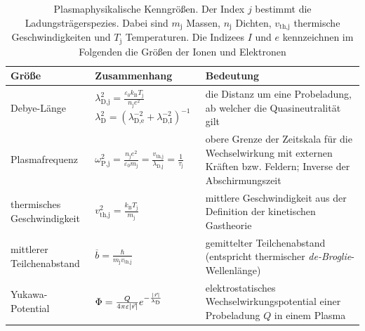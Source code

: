 \documentclass[numbers=noenddot,a4paper,notitlepage,twoside,BCOR15mm]{scrbook}
\newcommand{\ix}[1]{_\text{#1}}
\newcommand{\tilt}[1]{\textit{#1}}
\newcommand{\euler}{\mathnormal{e}}
\begin{document}
				\begin{table}[H]
					\centering
						\begin{tabular}{m{0.3\textwidth}|m{}|m{}}
							Größe & Zusammenhang & Bedeutung \\ 
							\hline  Debye-Länge & $\lambda\ix{D,j}^2=\frac{\varepsilon\ix{0}k\ix{B}T\ix{j}}{n\ix{j}e^2}$
							\newline
							$\lambda\ix{D}^2=\left(\lambda\ix{D,e}^{-2}+\lambda\ix{D,I}^{-2}\right)^{-1}$ & die Distanz um eine Probeladung, ab welcher die Quasineutralität gilt\\ 

							\hline Plasmafrequenz & $\omega\ix{P,j}^2=\frac{n\ix{j}e^2}{\varepsilon\ix{0}m\ix{j}}=\frac{v\ix{th,j}}{\lambda\ix{D,j}}=\frac{1}{\tau\ix{j}}$ & obere Grenze der Zeitskala für die Wechselwirkung mit externen Kräften bzw. Feldern; Inverse der Abschirmungszeit \\ 

							\hline thermisches Geschwindigkeit & $v\ix{th,j}^2=\frac{k\ix{B}T\ix{j}}{m\ix{j}}$ & mittlere Geschwindigkeit aus der Definition der kinetischen Gastheorie \\ 

							\hline mittlerer Teilchenabstand & $\overline{b}=\frac{\hbar}{m\ix{j}v\ix{th,j}}$ & gemittelter Teilchenabstand (entspricht thermischer \mbox{\tilt{de-Broglie}-Wellenlänge}) \\ 

							\hline Yukawa-Potential & $\Phi=\frac{Q}{4\pi\varepsilon|\vec{r}|}\euler^{-\frac{|\vec{r}|}{\lambda\ix{D}}}$ & elektrostatisches Wechselwirkungspotential einer Probeladung $Q$ in einem Plasma \\

							\hline

						\end{tabular}
					\caption{Plasmaphysikalische Kenngrößen. Der Index $j$ bestimmt die Ladungsträgerspezies. Dabei sind $m\ix{j}$ Massen, $n\ix{j}$ Dichten, $v\ix{th,j}$ thermische Geschwindigkeiten und $T\ix{j}$ Temperaturen. Die Indizees $I$ und $e$ kennzeichnen im Folgenden die Größen der Ionen und Elektronen}
					\label{tab:kenngroessen}
				\end{table}
\end{document}

